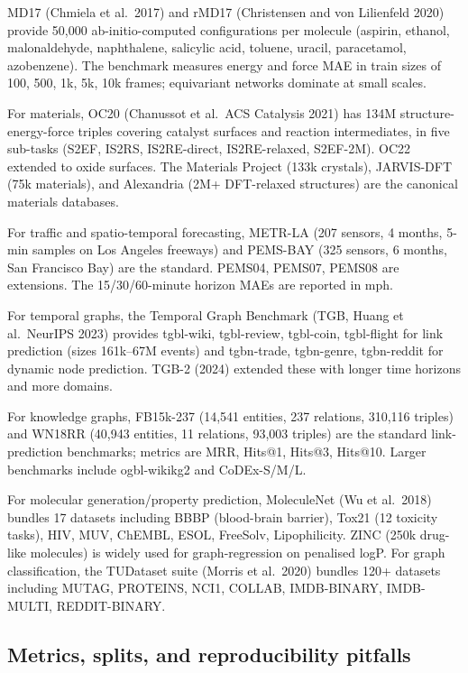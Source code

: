 MD17 (Chmiela et al.~2017) and rMD17 (Christensen and von Lilienfeld 2020) provide 50,000 ab-initio-computed configurations per molecule (aspirin, ethanol, malonaldehyde, naphthalene, salicylic acid, toluene, uracil, paracetamol, azobenzene). The benchmark measures energy and force MAE in train sizes of 100, 500, 1k, 5k, 10k frames; equivariant networks dominate at small scales.

For materials, OC20 (Chanussot et al.~ACS Catalysis 2021) has 134M structure-energy-force triples covering catalyst surfaces and reaction intermediates, in five sub-tasks (S2EF, IS2RS, IS2RE-direct, IS2RE-relaxed, S2EF-2M). OC22 extended to oxide surfaces. The Materials Project (133k crystals), JARVIS-DFT (75k materials), and Alexandria (2M+ DFT-relaxed structures) are the canonical materials databases.

For traffic and spatio-temporal forecasting, METR-LA (207 sensors, 4 months, 5-min samples on Los Angeles freeways) and PEMS-BAY (325 sensors, 6 months, San Francisco Bay) are the standard. PEMS04, PEMS07, PEMS08 are extensions. The 15/30/60-minute horizon MAEs are reported in mph.

For temporal graphs, the Temporal Graph Benchmark (TGB, Huang et al.~NeurIPS 2023) provides tgbl-wiki, tgbl-review, tgbl-coin, tgbl-flight for link prediction (sizes 161k--67M events) and tgbn-trade, tgbn-genre, tgbn-reddit for dynamic node prediction. TGB-2 (2024) extended these with longer time horizons and more domains.

For knowledge graphs, FB15k-237 (14,541 entities, 237 relations, 310,116 triples) and WN18RR (40,943 entities, 11 relations, 93,003 triples) are the standard link-prediction benchmarks; metrics are MRR, Hits@1, Hits@3, Hits@10. Larger benchmarks include ogbl-wikikg2 and CoDEx-S/M/L.

For molecular generation/property prediction, MoleculeNet (Wu et al.~2018) bundles 17 datasets including BBBP (blood-brain barrier), Tox21 (12 toxicity tasks), HIV, MUV, ChEMBL, ESOL, FreeSolv, Lipophilicity. ZINC (250k drug-like molecules) is widely used for graph-regression on penalised logP. For graph classification, the TUDataset suite (Morris et al.~2020) bundles 120+ datasets including MUTAG, PROTEINS, NCI1, COLLAB, IMDB-BINARY, IMDB-MULTI, REDDIT-BINARY.

\subsection{Metrics, splits, and reproducibility pitfalls}\label{metrics-splits-and-reproducibility-pitfalls}

